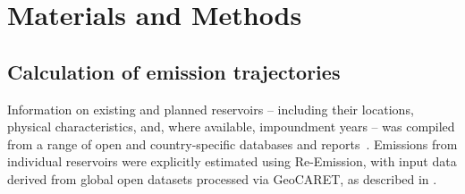 \documentclass[review, authoryear, 1p]{elsarticle} %
\begin{document}

\section{Materials and Methods}
\label{sec:materials_and_methods}

\subsection{Calculation of emission trajectories}
\label{subsec:myanmar_case_study_methods}

Information on existing and planned reservoirs -- including their locations, physical characteristics, and, where available, impoundment years -- was compiled from a range of open and country-specific databases and reports~\citep{ifc_dam_db, EA_Myanmar, Emmerton2015, opendevelopmentmya2018, PowerSector_Myanmar, sea2018}.
Emissions from individual reservoirs were explicitly estimated using Re-Emission, with input data derived from global open datasets processed via GeoCARET, as described in \citet{janus2025planning}.
\end{document}
